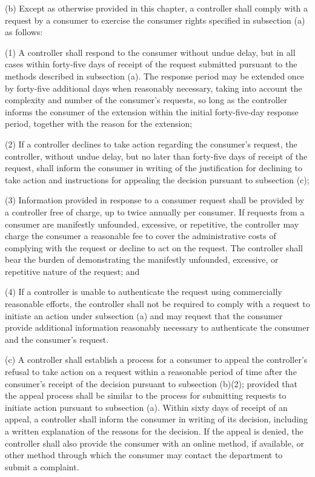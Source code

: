      (b)  Except as otherwise provided in this chapter, a controller shall comply with a request by a consumer to exercise the consumer rights specified in subsection (a) as follows:

     (1)  A controller shall respond to the consumer without undue delay, but in all cases within forty-five days of receipt of the request submitted pursuant to the methods described in subsection (a).  The response period may be extended once by forty-five additional days when reasonably necessary, taking into account the complexity and number of the consumer's requests, so long as the controller informs the consumer of the extension within the initial forty-five-day response period, together with the reason for the extension;

     (2)  If a controller declines to take action regarding the consumer's request, the controller, without undue delay, but no later than forty-five days of receipt of the request, shall inform the consumer in writing of the justification for declining to take action and instructions for appealing the decision pursuant to subsection (c);

     (3)  Information provided in response to a consumer request shall be provided by a controller free of charge, up to twice annually per consumer.  If requests from a consumer are manifestly unfounded, excessive, or repetitive, the controller may charge the consumer a reasonable fee to cover the administrative costs of complying with the request or decline to act on the request.  The controller shall bear the burden of demonstrating the manifestly unfounded, excessive, or repetitive nature of the request; and

     (4)  If a controller is unable to authenticate the request using commercially reasonable efforts, the controller shall not be required to comply with a request to initiate an action under subsection (a) and may request that the consumer provide additional information reasonably necessary to authenticate the consumer and the consumer's request.

     (c)  A controller shall establish a process for a consumer to appeal the controller's refusal to take action on a request within a reasonable period of time after the consumer's receipt of the decision pursuant to subsection (b)(2); provided that the appeal process shall be similar to the process for submitting requests to initiate action pursuant to subsection (a).  Within sixty days of receipt of an appeal, a controller shall inform the consumer in writing of its decision, including a written explanation of the reasons for the decision.  If the appeal is denied, the controller shall also provide the consumer with an online method, if available, or other method through which the consumer may contact the department to submit a complaint.

